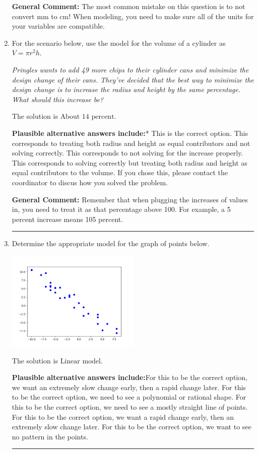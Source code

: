 \documentclass{extbook}[14pt]
\newcommand{\litem}[1]{\item #1

\rule{\textwidth}{0.4pt}}
\begin{document}
\begin{enumerate}
{\textbf{General Comment:} The most common mistake on this question is to not convert mm to cm! When modeling, you need to make sure all of the units for your variables are compatible.
}
\litem{
For the scenario below, use the model for the volume of a cylinder as $V = \pi r^2 h$.

\begin{center}
    \textit{ Pringles wants to add 49 \text{percent} more chips to their cylinder cans and minimize the design change of their cans. They've decided that the best way to minimize the design change is to increase the radius and height by the same percentage. What should this increase be? }
\end{center}
The solution is \( \text{About } 14 \text{ percent} \).\begin{enumerate}[label=\Alph*.]
\textbf{Plausible alternative answers include:}* This is the correct option.
This corresponds to treating both radius and height as equal contributors and not solving correctly.
This corresponds to not solving for the increase properly.
This corresponds to solving correctly but treating both radius and height as equal contributors to the volume.
If you chose this, please contact the coordinator to discus how you solved the problem.
\end{enumerate}

\textbf{General Comment:} Remember that when plugging the increases of values in, you need to treat it as that percentage above 100. For example, a 5 percent increase means 105 percent.
}
\litem{
Determine the appropriate model for the graph of points below.

\begin{center}
    \includegraphics[width=0.5\textwidth]{../Figures/identifyModelGraph12CopyB.png}
\end{center}


The solution is \( \text{Linear model} \).\begin{enumerate}[label=\Alph*.]
\textbf{Plausible alternative answers include:}For this to be the correct option, we want an extremely slow change early, then a rapid change later.
For this to be the correct option, we need to see a polynomial or rational shape.
For this to be the correct option, we need to see a mostly straight line of points.
For this to be the correct option, we want a rapid change early, then an extremely slow change later.
For this to be the correct option, we want to see no pattern in the points.
\end{enumerate}

}
\end{enumerate}
\end{document}
